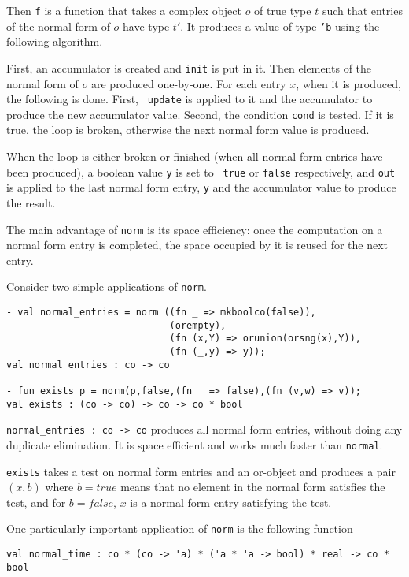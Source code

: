 Then {\tt f} is a function that takes a complex object $o$ of true type
$t$ such that entries of the normal form of $o$ have type $t'$. It
produces a value of type {\tt 'b} using the following algorithm.

First, an accumulator is created and {\tt init} is put in it. Then
elements of the normal form of $o$ are produced one-by-one. For each
entry $x$, when it is produced, the following is done. First, {\tt
update} is applied to it and the accumulator to produce the new
accumulator value. Second, the condition {\tt cond} is tested. If it
is true, the loop is broken, otherwise the next normal form value is
produced. 

When the loop is either broken or finished (when all normal form
entries have been produced), a boolean value {\tt y} is set to {\tt
true} or {\tt false} respectively, and {\tt out} is applied to the
last normal form entry, {\tt y} and the accumulator value to produce
the result.

The main advantage of {\tt norm} is its space efficiency: once the
computation on a normal form entry is completed, the space occupied by
it is reused for the next entry.

Consider two simple applications of {\tt norm}.

{\small
\begin{verbatim}
- val normal_entries = norm ((fn _ => mkboolco(false)), 
                             (orempty),
                             (fn (x,Y) => orunion(orsng(x),Y)),
                             (fn (_,y) => y));
val normal_entries : co -> co

- fun exists p = norm(p,false,(fn _ => false),(fn (v,w) => v));
val exists : (co -> co) -> co -> co * bool
\end{verbatim}
}

{\tt normal\_entries : co -> co} produces all normal form entries,
without doing any duplicate elimination. It is space efficient and
works much faster than {\tt normal}.

{\tt exists} takes a test on normal form entries and an or-object and
produces a pair $(x,b)$ where $b = true$ means that no element in the
normal form satisfies the test, and for $b = false$, $x$ is a normal
form entry satisfying the test.


One particularly important application of {\tt norm} is the following
function 

{\small
\begin{verbatim}
val normal_time : co * (co -> 'a) * ('a * 'a -> bool) * real -> co * bool
\end{verbatim}
}

